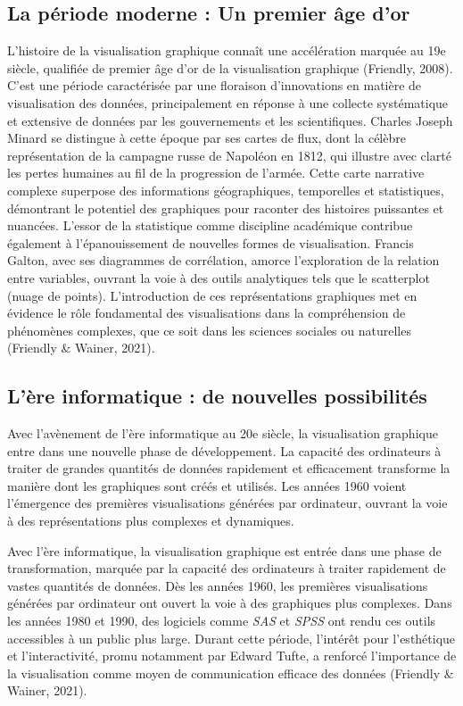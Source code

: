\documentclass[
  letterpaper,
  DIV=11,
  numbers=noendperiod]{scrreprt}
\begin{document}
\subsection{La période moderne : Un premier âge
d'or}\label{la-puxe9riode-moderne-un-premier-uxe2ge-dor}

L'histoire de la visualisation graphique connaît une accélération
marquée au 19e siècle, qualifiée de premier âge d'or de la visualisation
graphique (Friendly, 2008). C'est une période caractérisée par une
floraison d'innovations en matière de visualisation des données,
principalement en réponse à une collecte systématique et extensive de
données par les gouvernements et les scientifiques. Charles Joseph
Minard se distingue à cette époque par ses cartes de flux, dont la
célèbre représentation de la campagne russe de Napoléon en 1812, qui
illustre avec clarté les pertes humaines au fil de la progression de
l'armée. Cette carte narrative complexe superpose des informations
géographiques, temporelles et statistiques, démontrant le potentiel des
graphiques pour raconter des histoires puissantes et nuancées. L'essor
de la statistique comme discipline académique contribue également à
l'épanouissement de nouvelles formes de visualisation. Francis Galton,
avec ses diagrammes de corrélation, amorce l'exploration de la relation
entre variables, ouvrant la voie à des outils analytiques tels que le
scatterplot (nuage de points). L'introduction de ces représentations
graphiques met en évidence le rôle fondamental des visualisations dans
la compréhension de phénomènes complexes, que ce soit dans les sciences
sociales ou naturelles (Friendly \& Wainer, 2021).

\subsection{L'ère informatique : de nouvelles
possibilités}\label{luxe8re-informatique-de-nouvelles-possibilituxe9s}

Avec l'avènement de l'ère informatique au 20e siècle, la visualisation
graphique entre dans une nouvelle phase de développement. La capacité
des ordinateurs à traiter de grandes quantités de données rapidement et
efficacement transforme la manière dont les graphiques sont créés et
utilisés. Les années 1960 voient l'émergence des premières
visualisations générées par ordinateur, ouvrant la voie à des
représentations plus complexes et dynamiques.

Avec l'ère informatique, la visualisation graphique est entrée dans une
phase de transformation, marquée par la capacité des ordinateurs à
traiter rapidement de vastes quantités de données. Dès les années 1960,
les premières visualisations générées par ordinateur ont ouvert la voie
à des graphiques plus complexes. Dans les années 1980 et 1990, des
logiciels comme \emph{SAS} et \emph{SPSS} ont rendu ces outils
accessibles à un public plus large. Durant cette période, l'intérêt pour
l'esthétique et l'interactivité, promu notamment par Edward Tufte, a
renforcé l'importance de la visualisation comme moyen de communication
efficace des données (Friendly \& Wainer, 2021).
\end{document}
